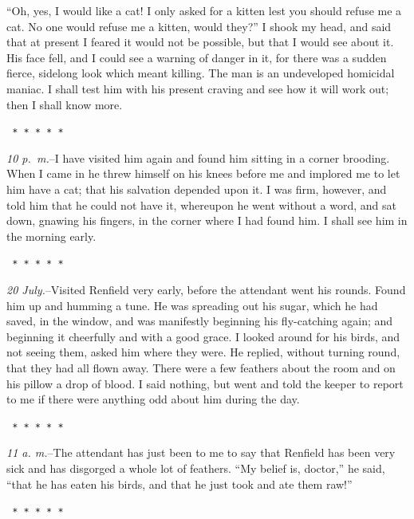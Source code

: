 \documentclass[12pt,openright]{book}
\begin{document}
“Oh, yes, I would like a cat! I only asked for a kitten lest you should refuse me a cat. No one would refuse me a kitten, would they?” I shook my head, and said that at present I feared it would not be possible, but that I would see about it. His face fell, and I could see a warning of danger in it, for there was a sudden fierce, sidelong look which meant killing. The man is an undeveloped homicidal maniac. I shall test him with his present craving and see how it will work out; then I shall know more.

\texttt{   *       *       *       *       *}

\textit{10 p. m.}–I have visited him again and found him sitting in a corner brooding. When I came in he threw himself on his knees before me and implored me to let him have a cat; that his salvation depended upon it. I was firm, however, and told him that he could not have it, whereupon he went without a word, and sat down, gnawing his fingers, in the corner where I had found him. I shall see him in the morning early.

\texttt{   *       *       *       *       *}

\textit{20 July.}–Visited Renfield very early, before the attendant went his rounds. Found him up and humming a tune. He was spreading out his sugar, which he had saved, in the window, and was manifestly beginning his fly-catching again; and beginning it cheerfully and with a good grace. I looked around for his birds, and not seeing them, asked him where they were. He replied, without turning round, that they had all flown away. There were a few feathers about the room and on his pillow a drop of blood. I said nothing, but went and told the keeper to report to me if there were anything odd about him during the day.

\texttt{   *       *       *       *       *}

\textit{11 a. m.}–The attendant has just been to me to say that Renfield has been very sick and has disgorged a whole lot of feathers. “My belief is, doctor,” he said, “that he has eaten his birds, and that he just took and ate them raw!”

\texttt{   *       *       *       *       *}
\end{document}
